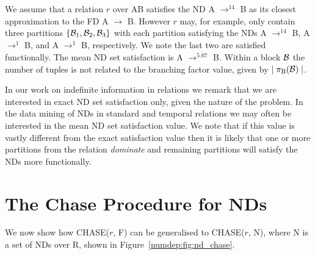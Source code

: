 \begin{example}\label{ex:mean_nd}
\begin{rm}
We assume that a relation $r$ over AB satisfies the ND A $\to^{14}$ B
as its closest approximation to the FD A $\to$ B. However $r$ may, for
example, only
contain three partitions $\{{\cal B}_1, {\cal B}_2, {\cal B}_3\}$
with each partition satisfying the NDs A $\to^{14}$ B, A $\to^{1}$ B,
and A $\to^{1}$ B, respectively. We note the last two are satisfied
functionally. The mean ND set satisfaction is A $\to^{\bar{5.67}}$ B.
Within a block $\cal B$ the number of tuples is not related to
the branching factor value, given by $\mid \pi_{\rm B}({\cal B}) \mid$.
\end{rm}
\end{example}

In our work on indefinite information in relations we remark that we
are interested in exact ND set satisfaction only, given the nature of
the problem. In the data mining of NDs in standard and temporal
relations we may often be interested in the mean ND set satisfaction
value. We note that if this value is vastly different from the exact
satisfaction value then it is likely that one or more partitions from
the relation {\em dominate} and remaining partitions will satisfy the
NDs more functionally.

\section{The Chase Procedure for NDs}\label{sec:nd_chase}

We now show how CHASE($r$, F) can be generalised to CHASE($r$, N), where N is
a set of NDs over R, shown in Figure~\ref{numdep:fig:nd_chase}.

